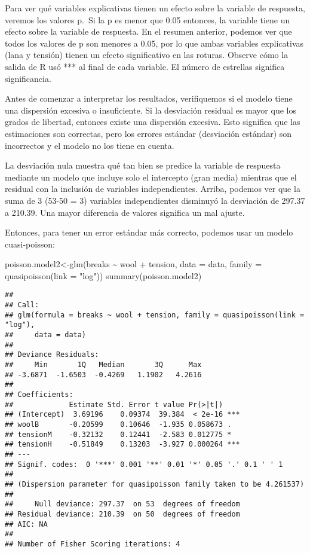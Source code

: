 \documentclass[
]{book}
\newenvironment{Shaded}{\begin{snugshade}}{\end{snugshade}}
\newcommand{\AttributeTok}[1]{\textcolor[rgb]{0.77,0.63,0.00}{#1}}
\newcommand{\FunctionTok}[1]{\textcolor[rgb]{0.00,0.00,0.00}{#1}}
\newcommand{\NormalTok}[1]{#1}
\newcommand{\OtherTok}[1]{\textcolor[rgb]{0.56,0.35,0.01}{#1}}
\newcommand{\SpecialCharTok}[1]{\textcolor[rgb]{0.00,0.00,0.00}{#1}}
\newcommand{\StringTok}[1]{\textcolor[rgb]{0.31,0.60,0.02}{#1}}
\begin{document}
Para ver qué variables explicativas tienen un efecto sobre la variable de respuesta, veremos los valores p.~Si la p es menor que 0.05 entonces, la variable tiene un efecto sobre la variable de respuesta. En el resumen anterior, podemos ver que todos los valores de p son menores a 0.05, por lo que ambas variables explicativas (lana y tensión) tienen un efecto significativo en las roturas. Observe cómo la salida de R usó *** al final de cada variable. El número de estrellas significa significancia.

Antes de comenzar a interpretar los resultados, verifiquemos si el modelo tiene una dispersión excesiva o insuficiente. Si la desviación residual es mayor que los grados de libertad, entonces existe una dispersión excesiva. Esto significa que las estimaciones son correctas, pero los errores estándar (desviación estándar) son incorrectos y el modelo no los tiene en cuenta.

La desviación nula muestra qué tan bien se predice la variable de respuesta mediante un modelo que incluye solo el intercepto (gran media) mientras que el residual con la inclusión de variables independientes. Arriba, podemos ver que la suma de 3 (53-50 = 3) variables independientes disminuyó la desviación de 297.37 a 210.39. Una mayor diferencia de valores significa un mal ajuste.

Entonces, para tener un error estándar más correcto, podemos usar un modelo cuasi-poisson:

\begin{Shaded}
\begin{Highlighting}[]
\NormalTok{poisson.model2}\OtherTok{\textless{}{-}}\FunctionTok{glm}\NormalTok{(breaks }\SpecialCharTok{\textasciitilde{}}\NormalTok{ wool }\SpecialCharTok{+}\NormalTok{ tension, }\AttributeTok{data =}\NormalTok{ data, }\AttributeTok{family =} \FunctionTok{quasipoisson}\NormalTok{(}\AttributeTok{link =} \StringTok{"log"}\NormalTok{))}
\FunctionTok{summary}\NormalTok{(poisson.model2)}
\end{Highlighting}
\end{Shaded}

\begin{verbatim}
## 
## Call:
## glm(formula = breaks ~ wool + tension, family = quasipoisson(link = "log"), 
##     data = data)
## 
## Deviance Residuals: 
##     Min       1Q   Median       3Q      Max  
## -3.6871  -1.6503  -0.4269   1.1902   4.2616  
## 
## Coefficients:
##             Estimate Std. Error t value Pr(>|t|)    
## (Intercept)  3.69196    0.09374  39.384  < 2e-16 ***
## woolB       -0.20599    0.10646  -1.935 0.058673 .  
## tensionM    -0.32132    0.12441  -2.583 0.012775 *  
## tensionH    -0.51849    0.13203  -3.927 0.000264 ***
## ---
## Signif. codes:  0 '***' 0.001 '**' 0.01 '*' 0.05 '.' 0.1 ' ' 1
## 
## (Dispersion parameter for quasipoisson family taken to be 4.261537)
## 
##     Null deviance: 297.37  on 53  degrees of freedom
## Residual deviance: 210.39  on 50  degrees of freedom
## AIC: NA
## 
## Number of Fisher Scoring iterations: 4
\end{verbatim}
\end{document}
